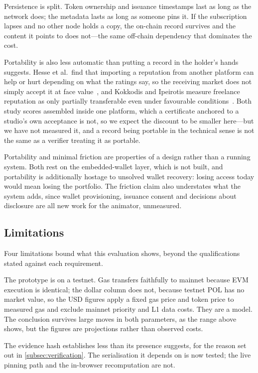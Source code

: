 Persistence is split. Token ownership and issuance timestamps last as long as the network
does; the metadata lasts as long as someone pins it. If the subscription lapses and no
other node holds a copy, the on-chain record survives and the content it points to does
not---the same off-chain dependency that dominates the cost.

Portability is also less automatic than putting a record in the holder's hands
suggests. Hesse et al.\ find that importing a reputation from another platform can help
or hurt depending on what the ratings say, so the receiving market does not simply
accept it at face value~\cite{hesse2021portability}, and Kokkodis and Ipeirotis measure
freelance reputation as only partially transferable even under favourable
conditions~\cite{kokkodis2016transferability}. Both study scores
assembled inside one platform, which a certificate anchored to a studio's own
acceptance is not, so we expect the discount to be smaller here---but we have not
measured it, and a record being portable in the technical sense is not the same as
a verifier treating it as portable.

Portability and minimal friction are properties of a design rather than a running system.
Both rest on the embedded-wallet layer, which is not built, and portability is additionally
hostage to unsolved wallet recovery: losing access today would mean losing the portfolio.
The friction claim also understates what the system adds, since wallet provisioning,
issuance consent and decisions about disclosure are all new work for the animator, unmeasured.

\subsection{Limitations}
\label{subsec:eval_limitations}

Four limitations bound what this evaluation shows, beyond the qualifications stated
against each requirement.

The prototype is on a testnet. Gas transfers faithfully to mainnet because EVM execution
is identical; the dollar column does not, because testnet POL has no market value, so the
USD figures apply a fixed gas price and token price to measured gas and exclude mainnet
priority and L1 data costs. They are a model. The conclusion survives large moves in both
parameters, as the range above shows, but the figures are projections rather than observed
costs.

The evidence hash establishes less than its presence suggests, for the reason set
out in \cref{subsec:verification}. The serialisation it depends on is now tested;
the live pinning path and the in-browser recomputation are not.


